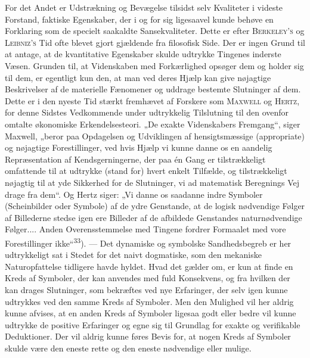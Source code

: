 \documentclass[12pt,a4paper,openany]{book}
\newcommand{\opage}[1]{\marginnote{\footnotesize\textit{[#1]}}}
\begin{document}
For det Andet er Udstrækning og Bevægelse tilsidst selv Kvaliteter i videste
Forstand, faktiske Egenskaber, der i og for sig ligesaavel kunde behøve en
Forklaring som de specielt saakaldte Sansekvaliteter. Dette er efter
\textsc{Berkeley's} og \textsc{Leibniz's} Tid ofte blevet gjort gjældende fra
filosofisk Side. Der er ingen Grund til at antage, at de kvantitative
Egenskaber skulde udtrykke Tingenes inderste Væsen. Grunden til, at Videnskaben
med Forkærlighed opsøger dem og holder sig til dem, er egentligt kun den, at
man ved deres Hjælp kan give nøjagtige Beskrivelser af de materielle Fænomener
og uddrage bestemte Slutninger af dem. Dette er i den nyeste Tid stærkt
fremhævet af Forskere som \textsc{Maxwell} og \textsc{Hertz}, for denne Sidstes
Vedkommende under udtrykkelig Tilslutning til den ovenfor omtalte økonomiske
Erkendelsesteori. „De exakte Videnskabers Fremgang“, siger Maxwell, „beror paa
Opdagelsen og Udviklingen af hensigtsmæssige (appropriate) og nøjagtige
Forestillinger, ved hvis Hjælp vi kunne danne os en aandelig Repræsentation af
Kendsgerningerne, der paa én Gang er tilstrækkeligt omfattende til at udtrykke
(stand for) hvert enkelt Tilfælde, og tilstrækkeligt nøjagtig til at yde
Sikkerhed for de Slutninger, vi ad matematisk Beregnings Vej drage fra dem“. Og
Hertz siger: „Vi danne os saadanne indre Symboler (Scheinbilder oder Symbole)
af de ydre Genstande, at de logisk nødvendige Følger
\opage{41}af Billederne stedse igen ere Billeder af de afbildede Genstandes
naturnødvendige Følger.... Anden Overensstemmelse med Tingene fordrer Formaalet
med vore Forestillinger ikke“\textsuperscript{33}). --- Det dynamiske og
symbolske Sandhedsbegreb er her udtrykkeligt sat i Stedet for det naivt
dogmatiske, som den mekaniske Naturopfattelse tidligere havde hyldet. Hvad det
gælder om, er kun at finde en Kreds af Symboler, der kan anvendes med fuld
Konsekvens, og fra hvilken der kan drages Slutninger, som bekræftes ved nye
Erfaringer, der selv igen kunne udtrykkes ved den samme Kreds af Symboler. Men
den Mulighed vil her aldrig kunne afvises, at en anden Kreds af Symboler
ligesaa godt eller bedre vil kunne udtrykke de positive Erfaringer og egne sig
til Grundlag for exakte og verifikable Deduktioner. Der vil aldrig kunne føres
Bevis for, at nogen Kreds af Symboler skulde være den eneste rette og den
eneste nødvendige eller mulige.
\end{document}
